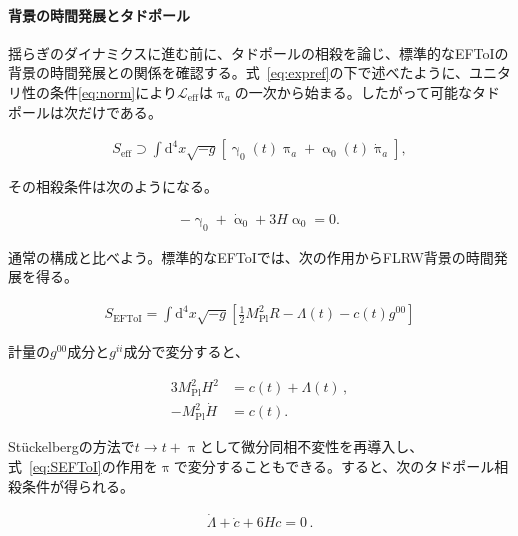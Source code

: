 \documentclass[a4paper,11pt]{ltjsarticle}
\numberwithin{equation}{section}
\newcommand{\dd}{\mathrm{d}}
\newcommand{\Eq}[1]{Eq.~(\ref{#1})}
\renewcommand{\Eq}[1]{式~\eqref{#1}}
\begin{document}
\begin{tcolorbox}[enhanced,breakable,skin first=enhanced,skin middle=enhanced,skin last=enhanced,before upper={\parindent15pt},]{}
\paragraph{背景の時間発展とタドポール}

揺らぎのダイナミクスに進む前に、タドポールの相殺\cite{Cheung:2007st,Collins:2012nq}を論じ、標準的なEFToIの背景の時間発展との関係を確認する。\Eq{eq:expref}の下で述べたように、ユニタリ性の条件\eqref{eq:norm}により$\mathcal{L}_{\mathrm{eff}}$は$\uppi_a$の一次から始まる。したがって可能なタドポールは次だけである\cite{LopezNacir:2011kk,Hongo:2018ant}。

\begin{align}\label{eq:tad1}
            S_{\mathrm{eff}}  \supset  \int \dd^4 x  \sqrt{-g} \left[ \upgamma_0(t) \uppi_a  + \upalpha_0(t) \dot{\uppi}_a \right],
\end{align}

その相殺条件は次のようになる。

\begin{align}
           - \upgamma_0 + \dot{\upalpha}_0 + 3H \upalpha_0 = 0.
        \end{align}

通常の構成と比べよう。標準的なEFToIでは、次の作用からFLRW背景の時間発展を得る。

\begin{align}\label{eq:SEFToI}
            S_{\mathrm{EFToI}} = \int \dd^4x \sqrt{-g} \left[\frac{1}{2} M_{\mathrm{Pl}}^2 R - \Lambda(t) - c(t) g^{00} \right]
        \end{align}

計量の$g^{00}$成分と$g^{ii}$成分で変分すると、

\begin{align}\label{comb1}
            3 M_{\mathrm{Pl}}^2  H^2 &= c(t) + \Lambda(t)\,, \\
            - M_{\mathrm{Pl}}^2 \dot{H} &= c(t). \label{comb2}
        \end{align}

St\"uckelbergの方法で$t\rightarrow t+\uppi$として微分同相不変性を再導入し、\Eq{eq:SEFToI}の作用を$\uppi$で変分することもできる。すると、次のタドポール相殺条件が得られる\cite{Cheung:2007st}。

\begin{align}\label{eq:tad2}
            \dot{\Lambda} + \dot{c} + 6 H c = 0\,.
        \end{align}


\end{tcolorbox}
\end{document}

